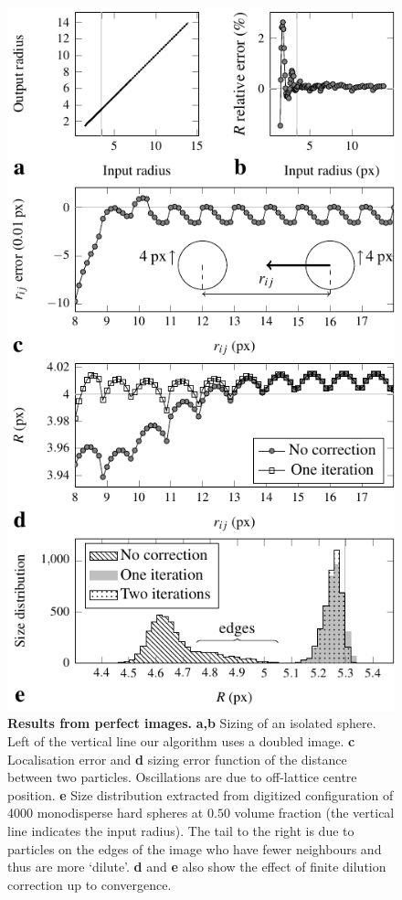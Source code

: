 \documentclass[8.5pt,twoside,twocolumn]{article}
\begin{document}
\begin{figure}
\centering
\includegraphics{fig_perfect.pdf}
	\caption{\textbf{Results from perfect images.} \textbf{a,b} Sizing of an isolated sphere. Left of the vertical line our algorithm uses a doubled image. \textbf{c} Localisation error and \textbf{d} sizing error function of the distance between two particles. Oscillations are due to off-lattice centre position. \textbf{e} Size distribution extracted from digitized configuration of 4000 monodisperse hard spheres at $0.50$ volume fraction (the vertical line indicates the input radius). The tail to the right is due to particles on the edges of the image who have fewer neighbours and thus are more `dilute'. \textbf{d} and \textbf{e} also show the effect of finite dilution correction up to convergence.}
	\label{fig:perfect}
\end{figure}
\end{document}
